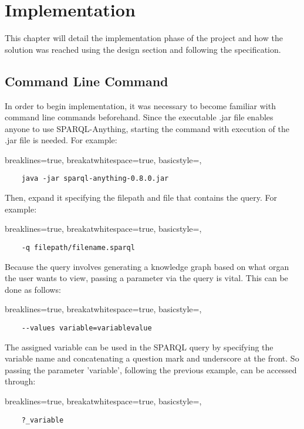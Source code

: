 \chapter{Implementation}
This chapter will detail the implementation phase of the project and how the solution was reached using the design section and following the specification. 

\section{Command Line Command}
\hspace*{0.5cm} In order to begin implementation, it was necessary to become familiar with command line commands beforehand. Since the executable .jar file enables anyone to use SPARQL-Anything, starting the command with execution of the .jar file is needed. For example:

\lstset
{
    breaklines=true,
    breakatwhitespace=true,
    basicstyle=\ttfamily,
}
\begin{lstlisting}
    java -jar sparql-anything-0.8.0.jar 
\end{lstlisting}

\noindent Then, expand it specifying the filepath and file that contains the query. For example:

\lstset
{
    breaklines=true,
    breakatwhitespace=true,
    basicstyle=\ttfamily,
}
\begin{lstlisting}
    -q filepath/filename.sparql
\end{lstlisting}

\noindent Because the query involves generating a knowledge graph based on what organ the user wants to view, passing a parameter via the query is vital. This can be done as follows:

\lstset
{
    breaklines=true,
    breakatwhitespace=true,
    basicstyle=\ttfamily,
}
\begin{lstlisting}
    --values variable=variablevalue
\end{lstlisting}

\noindent The assigned variable can be used in the SPARQL query by specifying the variable name and concatenating a question mark and underscore at the front. So passing the parameter 'variable', following the previous example, can be accessed through:

\lstset
{
    breaklines=true,
    breakatwhitespace=true,
    basicstyle=\ttfamily,
}
\begin{lstlisting}
    ?_variable
\end{lstlisting}

